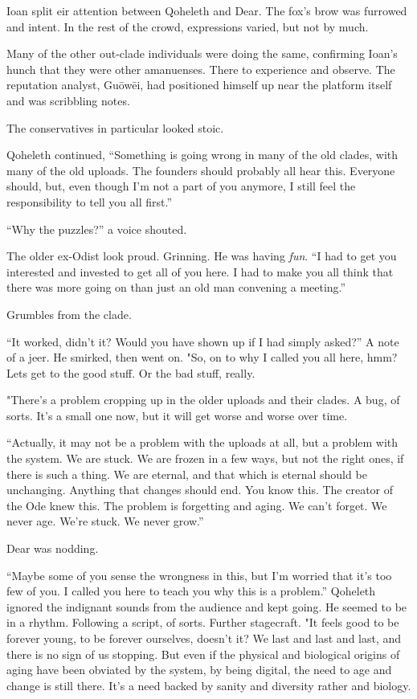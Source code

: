 Ioan split eir attention between Qoheleth and Dear. The fox's brow was furrowed and intent. In the rest of the crowd, expressions varied, but not by much.

Many of the other out-clade individuals were doing the same, confirming Ioan's hunch that they were other amanuenses. There to experience and observe. The reputation analyst, Guōwēi, had positioned himself up near the platform itself and was scribbling notes.

The conservatives in particular looked stoic.

Qoheleth continued, ``Something is going wrong in many of the old clades, with many of the old uploads. The founders should probably all hear this. Everyone should, but, even though I'm not a part of you anymore, I still feel the responsibility to tell you all first.''

``Why the puzzles?'' a voice shouted.

The older ex-Odist look proud. Grinning. He was having \emph{fun}. ``I had to get you interested and invested to get all of you here. I had to make you all think that there was more going on than just an old man convening a meeting.''

Grumbles from the clade.

``It worked, didn't it? Would you have shown up if I had simply asked?'' A note of a jeer. He smirked, then went on. "So, on to why I called you all here, hmm? Lets get to the good stuff. Or the bad stuff, really.

"There's a problem cropping up in the older uploads and their clades. A bug, of sorts. It's a small one now, but it will get worse and worse over time.

``Actually, it may not be a problem with the uploads at all, but a problem with the system. We are stuck. We are frozen in a few ways, but not the right ones, if there is such a thing. We are eternal, and that which is eternal should be unchanging. Anything that changes should end. You know this. The creator of the Ode knew this. The problem is forgetting and aging. We can't forget. We never age. We're stuck. We never grow.''

Dear was nodding.

``Maybe some of you sense the wrongness in this, but I'm worried that it's too few of you. I called you here to teach you why this is a problem.'' Qoheleth ignored the indignant sounds from the audience and kept going. He seemed to be in a rhythm. Following a script, of sorts. Further stagecraft. "It feels good to be forever young, to be forever ourselves, doesn't it? We last and last and last, and there is no sign of us stopping. But even if the physical and biological origins of aging have been obviated by the system, by being digital, the need to age and change is still there. It's a need backed by sanity and diversity rather and biology.

